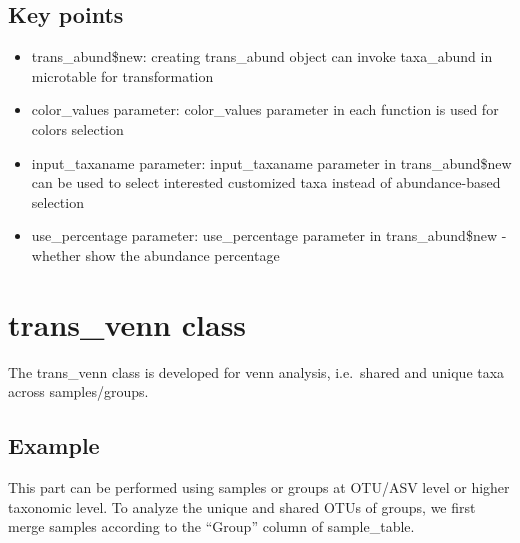 \documentclass[
]{book}
\newenvironment{Shaded}{\begin{snugshade}}{\end{snugshade}}
\newcommand{\AttributeTok}[1]{\textcolor[rgb]{0.77,0.63,0.00}{#1}}
\newcommand{\CommentTok}[1]{\textcolor[rgb]{0.56,0.35,0.01}{\textit{#1}}}
\newcommand{\ConstantTok}[1]{\textcolor[rgb]{0.00,0.00,0.00}{#1}}
\newcommand{\FunctionTok}[1]{\textcolor[rgb]{0.00,0.00,0.00}{#1}}
\newcommand{\NormalTok}[1]{#1}
\newcommand{\OtherTok}[1]{\textcolor[rgb]{0.56,0.35,0.01}{#1}}
\newcommand{\SpecialCharTok}[1]{\textcolor[rgb]{0.00,0.00,0.00}{#1}}
\newcommand{\StringTok}[1]{\textcolor[rgb]{0.31,0.60,0.02}{#1}}
\providecommand{\tightlist}{%
  \setlength{\itemsep}{0pt}\setlength{\parskip}{0pt}}
\begin{document}
\hypertarget{key-points-1}{%
\subsection{Key points}\label{key-points-1}}

\begin{itemize}
\tightlist
\item
  trans\_abund\$new: creating trans\_abund object can invoke taxa\_abund in microtable for transformation
\item
  color\_values parameter: color\_values parameter in each function is used for colors selection
\item
  input\_taxaname parameter: input\_taxaname parameter in trans\_abund\$new can be used to select interested customized taxa instead of abundance-based selection
\item
  use\_percentage parameter: use\_percentage parameter in trans\_abund\$new - whether show the abundance percentage
\end{itemize}

\hypertarget{trans_venn-class}{%
\section{trans\_venn class}\label{trans_venn-class}}

The trans\_venn class is developed for venn analysis, i.e.~shared and unique taxa across samples/groups.

\hypertarget{example-1}{%
\subsection{Example}\label{example-1}}

This part can be performed using samples or groups at OTU/ASV level or higher taxonomic level.
To analyze the unique and shared OTUs of groups,
we first merge samples according to the ``Group'' column of sample\_table.

\begin{Shaded}
\end{Shaded}
\end{document}
